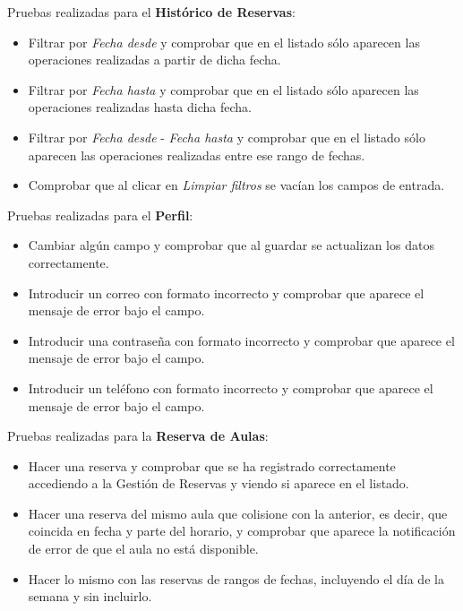 Pruebas realizadas para el \textbf{Histórico de Reservas}:
\begin{itemize}
    \item Filtrar por \textit{Fecha desde} y comprobar que en el listado sólo aparecen las operaciones realizadas a partir de dicha fecha.
    \item Filtrar por \textit{Fecha hasta} y comprobar que en el listado sólo aparecen las operaciones realizadas hasta dicha fecha.
    \item Filtrar por \textit{Fecha desde} - \textit{Fecha hasta} y comprobar que en el listado sólo aparecen las operaciones realizadas entre ese rango de fechas.
    \item Comprobar que al clicar en \textit{Limpiar filtros} se vacían los campos de entrada.
\end{itemize}

Pruebas realizadas para el \textbf{Perfil}:
\begin{itemize}
    \item Cambiar algún campo y comprobar que al guardar se actualizan los datos correctamente.
    \item Introducir un correo con formato incorrecto y comprobar que aparece el mensaje de error bajo el campo.
    \item Introducir una contraseña con formato incorrecto y comprobar que aparece el mensaje de error bajo el campo.
    \item Introducir un teléfono con formato incorrecto y comprobar que aparece el mensaje de error bajo el campo.
\end{itemize}

Pruebas realizadas para la \textbf{Reserva de Aulas}:
\begin{itemize}
    \item Hacer una reserva y comprobar que se ha registrado correctamente accediendo a la Gestión de Reservas y viendo si aparece en el listado.
    \item Hacer una reserva del mismo aula que colisione con la anterior, es decir, que coincida en fecha y parte del horario, y comprobar que aparece la notificación de error de que el aula no está disponible.
    \item Hacer lo mismo con las reservas de rangos de fechas, incluyendo el día de la semana y sin incluirlo.
\end{itemize}

